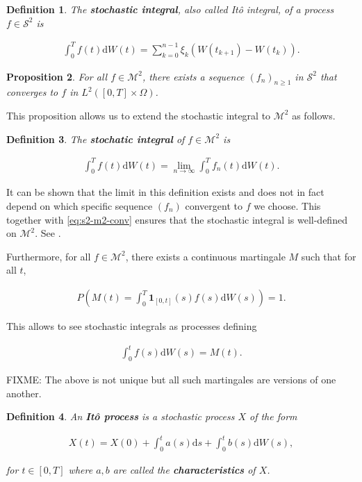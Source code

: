 \documentclass[a4paper]{article}
\newtheorem{definition}{Definition}[section]
\newtheorem{proposition}[definition]{Proposition}
\begin{document}
\begin{definition}
  The \textbf{stochastic integral}, also called It\^o integral, of a process $f \in \mathcal{S}^2$ is

  \begin{align*}
    \int_0^T f(t) \mathrm{d}W(t) = \sum_{k=0}^{n-1} \xi_k (W(t_{k+1}) - W(t_k)).
  \end{align*}
\end{definition}

\begin{proposition}\label{eq:s2-m2-conv}
  For all $f \in \mathcal{M}^2$, there exists a sequence $(f_n)_{n \ge 1}$ in $\mathcal{S}^2$ that converges to $f$ in $L^2([0,T] \times \Omega)$.
\end{proposition}

This proposition allows us to extend the stochastic integral to $\mathcal{M}^2$ as follows.

\begin{definition}
  The \textbf{stochatic integral} of $f \in \mathcal{M}^2$ is

  \begin{align*}
    \int_0^T f(t) \mathrm{d}W(t) = \lim_{n \to \infty} \int_0^T f_n(t) \mathrm{d}W(t).
  \end{align*}
\end{definition}

It can be shown that the limit in this definition exists and does not in fact depend on which specific sequence $(f_n)$ convergent to $f$ we choose. This together with \eqref{eq:s2-m2-conv} ensures that the stochastic integral is well-defined on $\mathcal{M}^2$. See \textcite{capinski_stochastic_2012}.

Furthermore, for all $f \in \mathcal{M}^2$, there exists a continuous martingale $M$ such that for all $t$,

\begin{align*}
  P\left(M(t) = \int_0^T \mathbf{1}_{[0,t]}(s) f(s) \mathrm{d}W(s)\right) = 1.
\end{align*}

This allows to see stochastic integrals as processes defining

\begin{align*}
  \int_0^t f(s) \mathrm{d}W(s) = M(t).
\end{align*}

FIXME: The above is not unique but all such martingales are versions of one another.

\begin{definition}
  An \textbf{It\^o process} is a stochastic process $X$ of the form

  \begin{align}\label{eq:def-ito-process}
    X(t) = X(0) + \int_0^t a(s) \mathrm{d}s + \int_0^t b(s) \mathrm{d}W(s),
  \end{align}

  for $t \in [0,T]$ where $a,b$ are called the \textbf{characteristics} of $X$.
\end{definition}
\end{document}
